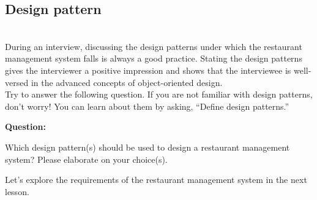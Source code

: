 \subsection{Design pattern~}\label{LldEllo7t25aIKUG6troB}
\\
During an interview, discussing the design patterns under which the restaurant management system falls is always a good practice. Stating the design patterns gives the interviewer a positive impression and shows that the interviewee is well-versed in the advanced concepts of object-oriented design.
\\
Try to answer the following question. If you are not familiar with design patterns, don't worry! You can learn about them by asking, ``Define design patterns.''

\textbf{Question:}

Which design pattern(s) should be used to design a restaurant management system? Please elaborate on your choice(s).

Let's explore the requirements of the restaurant management system in the next lesson.


